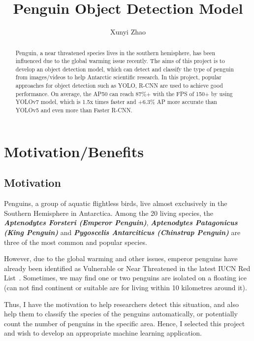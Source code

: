 \documentclass[runningheads]{llncs}
\begin{document}
%
\title{Penguin Object Detection Model}

\author{Xunyi Zhao}
%
\maketitle
%
\begin{abstract}
Penguin, a near threatened species lives in the southern hemisphere, has been influenced due to the global warming issue recently. The aims of this project is to develop an object detection model, which can  detect and classify the type of penguin from images/videos to help Antarctic scientific research. In this project, popular approaches for object detection such as YOLO, R-CNN are used to achieve good performance. On average, the AP50 can reach 87\%+ with the FPS of 150+ by using YOLOv7 model, which is 1.5x times faster and +6.3\% AP more accurate than YOLOv5 and even more than Faster R-CNN.

\end{abstract}
%
%

\section{Motivation/Benefits}
\subsection{Motivation}
Penguins, a group of aquatic flightless birds, live almost exclusively in the Southern Hemisphere in Antarctica. Among the 20 living species, the \textbf{\textit{Aptenodytes Forsteri (Emperor Penguin)}}, \textbf{\textit{Aptenodytes Patagonicus (King Penguin)}} and \textbf{\textit{Pygoscelis Antarciticus (Chinstrap Penguin)}} are three of the most common and popular species. 

However, due to the global warming and other issues, emperor penguins have already been identified as Vulnerable or Near Threatened in the latest IUCN Red List~\cite{ref_red_list}. Sometimes, we may find one or two penguins are isolated on a floating ice (can not find continent or suitable are for living within 10 kilometres around it).

Thus, I have the motivation to help researchers detect this situation, and also help them to classify the species of the penguins automatically, or potentially count the number of penguins in the specific area. Hence, I selected this project and wish to develop an appropriate machine learning application.
\end{document}
